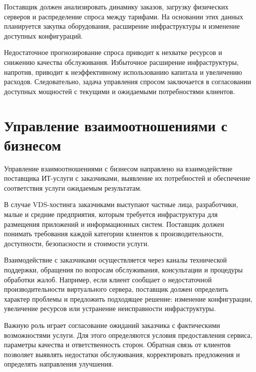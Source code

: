 \documentclass[14pt,a4paper]{extarticle}
\begin{document}
Поставщик должен анализировать динамику заказов, загрузку физических серверов и распределение спроса между тарифами. На основании этих данных планируется закупка оборудования, расширение инфраструктуры и изменение доступных конфигураций.

Недостаточное прогнозирование спроса приводит к нехватке ресурсов и снижению качества обслуживания. Избыточное расширение инфраструктуры, напротив, приводит к неэффективному использованию капитала и увеличению расходов. Следовательно, задача управления спросом заключается в согласовании доступных мощностей с текущими и ожидаемыми потребностями клиентов.

\section{Управление взаимоотношениями с бизнесом}

Управление взаимоотношениями с бизнесом направлено на взаимодействие поставщика ИТ-услуги с заказчиками, выявление их потребностей и обеспечение соответствия услуги ожидаемым результатам.

В случае VDS-хостинга заказчиками выступают частные лица, разработчики, малые и средние предприятия, которым требуется инфраструктура для размещения приложений и информационных систем. Поставщик должен понимать требования каждой категории клиентов к производительности, доступности, безопасности и стоимости услуги.

Взаимодействие с заказчиками осуществляется через каналы технической поддержки, обращения по вопросам обслуживания, консультации и процедуры обработки жалоб. Например, если клиент сообщает о недостаточной производительности виртуального сервера, поставщик должен определить характер проблемы и предложить подходящее решение: изменение конфигурации, увеличение ресурсов или устранение неисправности инфраструктуры.

Важную роль играет согласование ожиданий заказчика с фактическими возможностями услуги. Для этого определяются условия предоставления сервиса, параметры качества и ответственность сторон. Обратная связь от клиентов позволяет выявлять недостатки обслуживания, корректировать предложения и определять направления улучшения.
\end{document}
